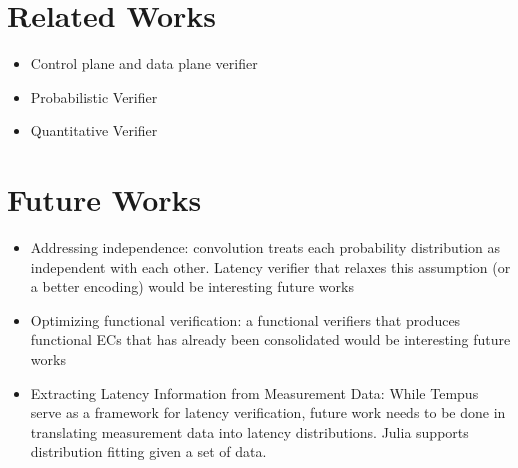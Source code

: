 \documentclass[10pt,sigconf,letterpaper,anonymous,nonacm]{acmart}
\begin{document}


\section{Related Works}
\begin{itemize}
    \item Control plane and data plane verifier
    \item Probabilistic Verifier 
    \item Quantitative Verifier
\end{itemize}

\section{Future Works}
\begin{itemize}
    \item Addressing independence: convolution treats each probability distribution as independent 
        with each other. Latency verifier that relaxes this assumption (or a better encoding) would be 
        interesting future works
    \item Optimizing functional verification: a functional verifiers that produces functional ECs that 
        has already been consolidated would be interesting future works
    \item Extracting Latency Information from Measurement Data: While Tempus serve as a framework for 
        latency verification, future work needs to be done in translating measurement data into latency 
        distributions. Julia supports distribution fitting given a set of data. 
\end{itemize}
\end{document}
